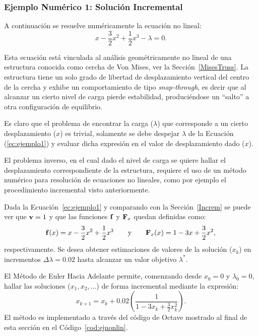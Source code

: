 \subsubsection{Ejemplo Numérico 1: Solución Incremental}\label{ej1}

A continuación se resuelve numéricamente la ecuación no lineal:
%
\begin{equation}\label{ec:ejemplo1}
x-\frac{3}{2}x^2+\frac{1}{2}x^3-\lambda=0.
\end{equation}

Esta ecuación está vinculada al análisis geométricamente no lineal de una estructura conocida como cercha de Von Mises, ver la Sección~\ref{MisesTruss}. La estructura tiene un solo grado de libertad de desplazamiento vertical del centro de la cercha y exhibe un comportamiento de tipo \textit{snap-through}, es decir que al alcanzar un cierto nivel de carga pierde estabilidad, produciéndose un ``salto'' a otra configuración de equilibrio.


Es claro que el problema de encontrar la carga ($\lambda$) que corresponde a un cierto desplazamiento ($x$) es trivial, solamente se debe despejar $\lambda$ de la Ecuación (\ref{ec:ejemplo1}) y evaluar dicha expresión en el valor de desplazamiento dado ($x$).

El problema inverso, en el cual dado el nivel de carga se quiere hallar el desplazamiento correspondiente de la estructura, requiere el uso de un método numérico para resolución de ecuaciones no lineales, como por ejemplo el procedimiento incremental visto anteriormente.

Dada la Ecuación~\eqref{ec:ejemplo1} y comparando con la Sección~\ref{Increm} se puede ver que ${\bf v} = 1$ y que las funciones ${\bf f}$ y ${\bf F}_x$ quedan definidas como: 
%
\begin{equation}
	{\bf f}(x)=x-\frac{3}{2}x^2+\frac{1}{2}x^3 \qquad \text{y} \qquad  {\bf F}_x(x)=1-3x+\frac{3}{2}x^2,
\end{equation}
respectivamente. %
%
Se desea obtener estimaciones de valores de la solución ($x_k$) en incrementos $\Delta \lambda=0.02$ hasta alcanzar un valor objetivo $\lambda^*$. %

El Método de Euler Hacia Adelante permite, comenzando desde $x_0=0$ y $\lambda_0=0$, hallar las soluciones ($x_1, x_2, ...$) de forma incremental mediante la expresión:
%
\begin{equation}
	x_{k+1} = x_k + 0.02 \left(\frac{1}{1-3x_k+\frac{3}{2}x_k^2}\right).
\end{equation}
%
El método es implementado a través del código de Octave mostrado al final de esta sección en el Código~\ref{cod:ejnonlin}.

